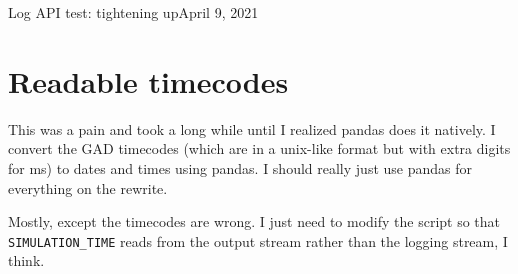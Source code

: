 \begin{entry}{Log API test: tightening up}{April 9, 2021}
        \section{Readable timecodes}
            This was a pain and took a long while until I realized pandas does it natively. I convert the GAD timecodes
            (which are in a unix-like format but with extra digits for ms) to dates and times using pandas. I should
            really just use pandas for everything on the rewrite.



    \results
    
    Mostly, except the timecodes are wrong. I just need to modify the script so that \verb"SIMULATION_TIME" reads from the
    output stream rather than the logging stream, I think.
    
\end{entry}


%
%
%
%
%
%
%
%
%
%
%
%
%
